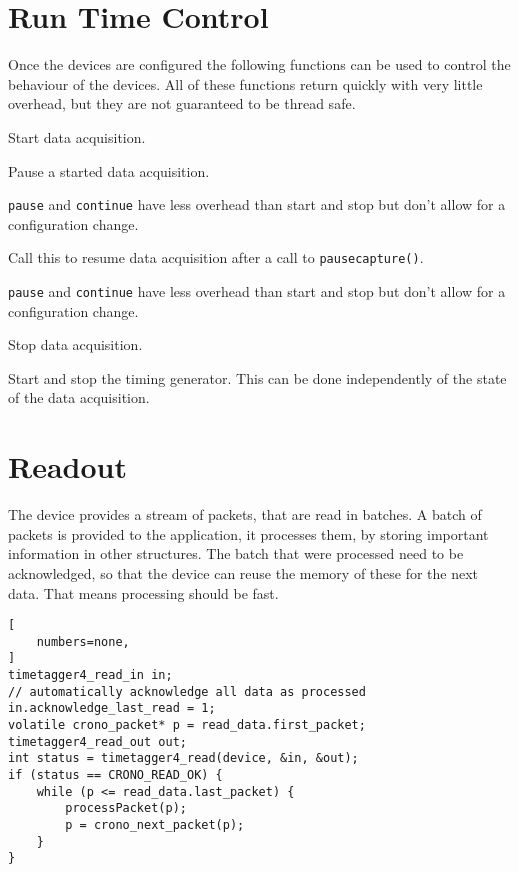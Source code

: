 
\section{Run Time Control}

Once the devices are configured the following functions can be used to control
the behaviour of the devices.  All of these functions return quickly with very
little overhead, but they are not guaranteed to be thread safe.

\begin{description}[style=nextline]
    \item[\ttvar{int}{start\tu capture(}\device)]
    Start data acquisition.\par

    \item[\ttvar{int}{pause\tu capture(}\device)]
    Pause a started data acquisition. \par
    \texttt{pause} and \texttt{continue} have less overhead than start and
    stop but don't allow for a configuration change.

    \item[\ttvar{int}{continue\tu capture(}\device)]
    Call this to resume data acquisition after a call to
    \texttt{\prefix pause\tu capture()}. \par
    \texttt{pause} and \texttt{continue} have less overhead than start and
    stop but don't allow for a configuration change.

    \item[\ttvar{int}{stop\tu capture(}\device)]
    Stop data acquisition.\par
    
    \item[\protect{\parbox[b]{0.8\linewidth}{
        \ttvar{int}{start\tu tiger(}\device)\\
        \ttvar{int}{stop\tu tiger(}\device)}}]
    Start and stop the timing generator. This can be done independently of the
    state of the data acquisition.
\end{description}

\section{Readout}
The device provides a stream of packets, that are read in batches. A batch of
packets is provided to the application, it processes them, by storing important information
in other structures. The batch that were processed need to be acknowledged, so that
the device can reuse the memory of these for the next data. That means processing
should be fast. 
\begin{lstlisting}[
    numbers=none,
]
timetagger4_read_in in;
// automatically acknowledge all data as processed
in.acknowledge_last_read = 1;
volatile crono_packet* p = read_data.first_packet;
timetagger4_read_out out;
int status = timetagger4_read(device, &in, &out);
if (status == CRONO_READ_OK) {
    while (p <= read_data.last_packet) {
        processPacket(p);
        p = crono_next_packet(p);
    }    
}
\end{lstlisting}
    
